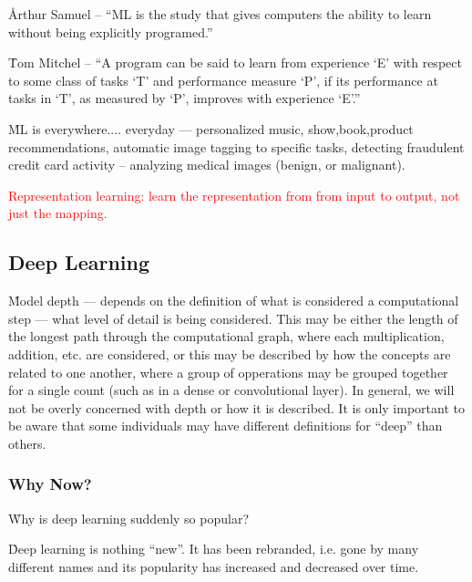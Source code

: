 \r{Arthur Samuel -- ``ML is the study that gives computers the ability to learn without being explicitly programed.''}

\r{Tom Mitchel -- ``A program can be said to learn from experience `E' with respect to some class of tasks `T' and performance measure `P', if its performance at tasks in `T', as measured by `P', improves with experience `E'.''}

\r{ML is everywhere.... everyday --- personalized music, show,book,product recommendations, automatic image tagging to specific tasks, detecting fraudulent credit card activity -- analyzing medical images (benign, or malignant). }


\textcolor{red}{Representation learning: learn the representation from from input to output, not just the mapping.}




\subsection{Deep Learning}


\r{Model depth --- depends on the definition of what is considered a computational step --- what level of detail is being considered. This may be either the length of the longest path through the computational graph, where each multiplication, addition, etc. are considered, or this may be described by how the concepts are related to one another, where a group of opperations may be grouped together for a single count (such as in a dense or convolutional layer). In general, we will not be overly concerned with depth or how it is described. It is only important to be aware that some individuals may have different definitions for ``deep'' than others.}

\subsubsection{Why Now?}

\r{Why is deep learning suddenly so popular?}

\r{Deep learning is nothing ``new''. It has been rebranded, i.e. gone by many different names  and its popularity has increased and decreased over time.}

